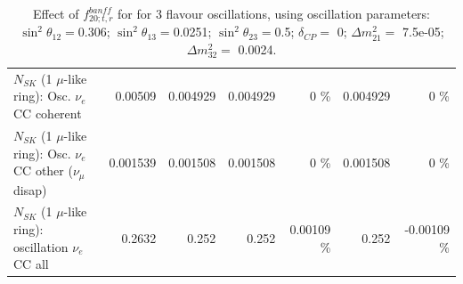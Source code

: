 \begin{table}
\begin{tabular}{| l | r | r | r  r | r  r |}
                          $N_{SK}$ (1 $\mu$-like ring): Osc. $\nu_e$ CC coherent &         0.00509 &        0.004929 &        0.004929 &        0 \%  &        0.004929 &        0 \%  \\ 
           $N_{SK}$ (1 $\mu$-like ring): Osc. $\nu_e$ CC other ($\nu_\mu$ disap) &        0.001539 &        0.001508 &        0.001508 &        0 \%  &        0.001508 &        0 \%  \\ 
                        $N_{SK}$ (1 $\mu$-like ring): oscillation $\nu_e$ CC all &          0.2632 &           0.252 &           0.252 &  0.00109 \%  &           0.252 & -0.00109 \%  \\ 
\hline
\hline
\end{tabular}
\caption{ Effect of $f_{20; t, r}^{banff}$ for for 3 flavour oscillations, using oscillation parameters:  $\sin^2\theta_{12} = $0.306; $\sin^2\theta_{13} = $0.0251; $\sin^2\theta_{23} = $0.5; $\delta_{CP} = $        0; $\Delta m^2_{21} = $    7.5e-05; $\Delta m^2_{32} = $    0.0024. }
\label{tab:num_banff_ccqeE2_1RmuT_3f_osc_t13:0.0251}
\end{table}
\clearpage
